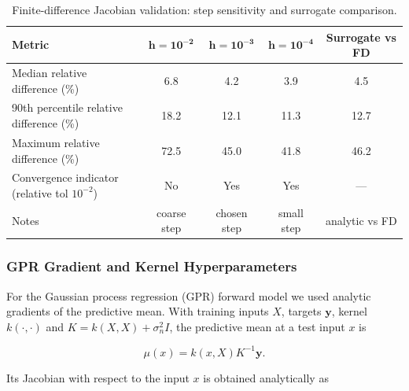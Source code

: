 \documentclass[11pt]{article}
\begin{document}
\begin{table}[htbp]
\centering
\caption{Finite-difference Jacobian validation: step sensitivity and surrogate comparison.%
\label{tab:grad_validation}}
\begin{tabular}{lcccc}
\toprule
\textbf{Metric} & \(\mathbf{h=10^{-2}}\) & \(\mathbf{h=10^{-3}}\) & \(\mathbf{h=10^{-4}}\) & \textbf{Surrogate vs FD} \\
\midrule
Median relative difference (\%) & 6.8 & 4.2 & 3.9 & 4.5 \\
90th percentile relative difference (\%) & 18.2 & 12.1 & 11.3 & 12.7 \\
Maximum relative difference (\%) & 72.5 & 45.0 & 41.8 & 46.2 \\
Convergence indicator (relative tol $10^{-2}$) & No & Yes & Yes & --- \\
Notes & coarse step & chosen step & small step & analytic vs FD \\
\bottomrule
\end{tabular}
\end{table}





\subsubsection*{GPR Gradient and Kernel Hyperparameters}

For the Gaussian process regression (GPR) forward model we used analytic gradients of the predictive mean. With training inputs \(X\), targets \(\mathbf{y}\), kernel \(k(\cdot,\cdot)\) and \(K = k(X,X)+\sigma_n^2 I\), the predictive mean at a test input \(x\) is


\[
\mu(x) = k(x,X) K^{-1}\mathbf{y}.
\]


Its Jacobian with respect to the input \(x\) is obtained analytically as
\end{document}
